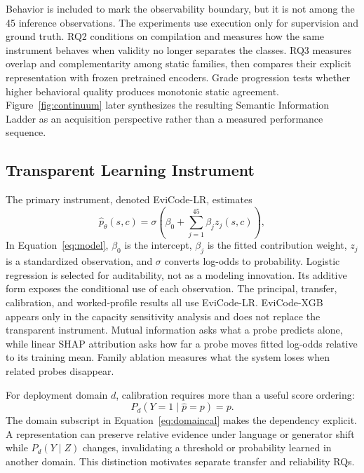 \documentclass[conference]{IEEEtran}
\begin{document}
Behavior is included to mark the observability boundary, but it is not among the 45 inference observations. The experiments use execution only for supervision and ground truth. RQ2 conditions on compilation and measures how the same instrument behaves when validity no longer separates the classes. RQ3 measures overlap and complementarity among static families, then compares their explicit representation with frozen pretrained encoders. Grade progression tests whether higher behavioral quality produces monotonic static agreement. Figure~\ref{fig:continuum} later synthesizes the resulting Semantic Information Ladder as an acquisition perspective rather than a measured performance sequence.

\subsection{Transparent Learning Instrument}
The primary instrument, denoted EviCode-LR, estimates
\begin{equation}
\hat p_\theta(s,c)=\sigma\!\left(\beta_0+\sum_{j=1}^{45}\beta_j z_j(s,c)\right),
\label{eq:model}
\end{equation}
In Equation~\ref{eq:model}, $\beta_0$ is the intercept, $\beta_j$ is the fitted contribution weight, $z_j$ is a standardized observation, and $\sigma$ converts log-odds to probability. Logistic regression is selected for auditability, not as a modeling innovation. Its additive form exposes the conditional use of each observation. The principal, transfer, calibration, and worked-profile results all use EviCode-LR. EviCode-XGB appears only in the capacity sensitivity analysis and does not replace the transparent instrument. Mutual information asks what a probe predicts alone, while linear SHAP attribution asks how far a probe moves fitted log-odds relative to its training mean. Family ablation measures what the system loses when related probes disappear.

For deployment domain $d$, calibration requires more than a useful score ordering:
\begin{equation}
P_d(Y=1\mid \hat p=p)=p.
\label{eq:domaincal}
\end{equation}
The domain subscript in Equation~\ref{eq:domaincal} makes the dependency explicit. A representation can preserve relative evidence under language or generator shift while $P_d(Y\mid Z)$ changes, invalidating a threshold or probability learned in another domain. This distinction motivates separate transfer and reliability RQs.
\end{document}
